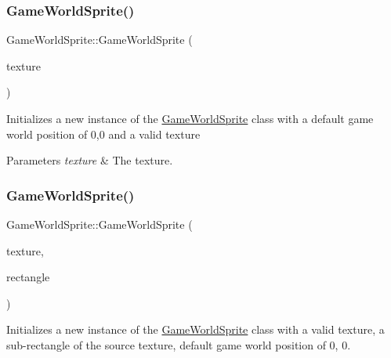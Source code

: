 \mbox{\label{class_game_world_sprite_a973f48586038da4f94a2b504c484918a}} 
\subsubsection{\texorpdfstring{Game\+World\+Sprite()}{GameWorldSprite()}\hspace{0.1cm}{\footnotesize\ttfamily [2/3]}}
{\footnotesize\ttfamily Game\+World\+Sprite\+::\+Game\+World\+Sprite (\begin{DoxyParamCaption}\item[{const sf\+::\+Texture \&}]{texture }\end{DoxyParamCaption})\hspace{0.3cm}{\ttfamily [explicit]}}



Initializes a new instance of the \hyperlink{class_game_world_sprite}{Game\+World\+Sprite} class with a default game world position of 0,0 and a valid texture 


\begin{DoxyParams}{Parameters}
{\em texture} & The texture.\\
\hline
\end{DoxyParams}
\mbox{\label{class_game_world_sprite_a99c58b4dfb012959edf78f66f994a6d5}} 
\subsubsection{\texorpdfstring{Game\+World\+Sprite()}{GameWorldSprite()}\hspace{0.1cm}{\footnotesize\ttfamily [3/3]}}
{\footnotesize\ttfamily Game\+World\+Sprite\+::\+Game\+World\+Sprite (\begin{DoxyParamCaption}\item[{const sf\+::\+Texture \&}]{texture,  }\item[{const sf\+::\+Int\+Rect \&}]{rectangle }\end{DoxyParamCaption})}



Initializes a new instance of the \hyperlink{class_game_world_sprite}{Game\+World\+Sprite} class with a valid texture, a sub-\/rectangle of the source texture, default game world position of 0, 0. 


